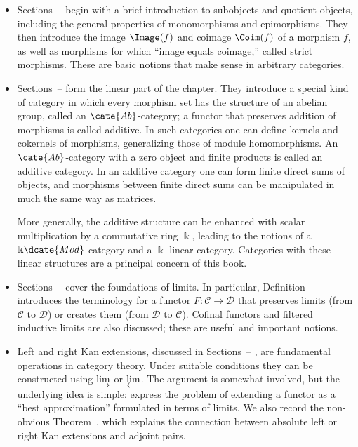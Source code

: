 \begin{itemize}
	\item Sections~--%
	 begin with a brief introduction to
	subobjects and quotient objects, including the general properties of
	monomorphisms and epimorphisms. They then introduce the image $\Image(f)$
	and coimage $\Coim(f)$ of a morphism $f$, as well as morphisms for which
	``image equals coimage,'' called strict morphisms. These are basic notions
	that make sense in arbitrary categories.

	\item Sections~--%
	 form the linear part of the chapter.
	They introduce a special kind of category in which every morphism set has
	the structure of an abelian group, called an $\cate{Ab}$-category; a functor
	that preserves addition of morphisms is called additive. In such categories
	one can define kernels and cokernels of morphisms, generalizing those of
	module homomorphisms. An $\cate{Ab}$-category with a zero object and finite
	products is called an additive category. In an additive category one can
	form finite direct sums of objects, and morphisms between finite direct sums
	can be manipulated in much the same way as matrices.

	More generally, the additive structure can be enhanced with scalar
	multiplication by a commutative ring $\Bbbk$, leading to the notions of a
	$\Bbbk\dcate{Mod}$-category and a $\Bbbk$-linear category. Categories with
	these linear structures are a principal concern of this book.

	\item Sections~--%
	 cover the foundations of limits.
	In particular, Definition~
	introduces the terminology for a functor $F:\mathcal C\to\mathcal D$
	that preserves limits (from $\mathcal C$ to $\mathcal D$) or creates them
	(from $\mathcal D$ to $\mathcal C$). Cofinal functors and filtered
	inductive limits are also discussed; these are useful and important
	notions.

	\item Left and right Kan extensions, discussed in Sections~--%
	, are fundamental operations in
	category theory. Under suitable conditions they can be constructed using
	$\varinjlim$ or $\varprojlim$. The argument is somewhat involved, but the
	underlying idea is simple: express the problem of extending a functor as a
	``best approximation'' formulated in terms of limits. We also record the
	non-obvious Theorem~,
	which explains the connection between absolute left or right Kan extensions
	and adjoint pairs.


\end{itemize}
